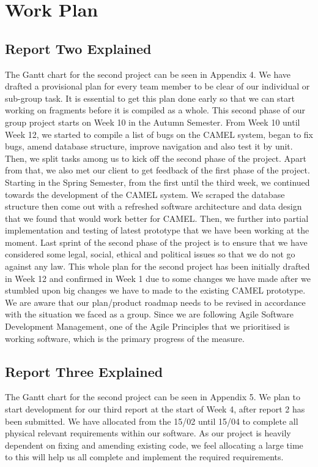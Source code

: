 \section{Work Plan}
\subsection*{Report Two Explained}
The Gantt chart for the second project can be seen in Appendix 4. We have drafted a provisional plan for every team member to be clear of our individual or sub-group task. It is essential to get this plan done early so that we can start working on fragments before it is compiled as a whole. This second phase of our group project starts on Week 10 in the Autumn Semester. From Week 10 until Week 12, we started to compile a list of bugs on the CAMEL system, began to fix bugs, amend database structure, improve navigation and also test it by unit. Then, we split tasks among us to kick off the second phase of the project. Apart from that, we also met our client to get feedback of the first phase of the project. Starting in the Spring Semester, from the first until the third week, we continued towards the development of the CAMEL system. We scraped  the database structure then come out with a refreshed software architecture and data design that we found that would work better for CAMEL. Then, we further into partial implementation and testing of latest prototype that we have been working at the moment. Last sprint of the second phase of the project is to ensure that we have considered some legal, social, ethical and political issues so that we do not go against any law. This whole plan for the second project has been initially drafted in Week 12 and  confirmed in Week 1 due to some changes we have made after we stumbled upon big changes we have to made to the existing CAMEL prototype. We are aware that our plan/product roadmap needs to be revised in accordance with the  situation we faced as a group.  Since we are following Agile Software Development Management, one of the Agile Principles that we prioritised is working software, which is the primary progress of the measure.\\

\subsection*{Report Three Explained}

The Gantt chart for the second project can be seen in Appendix 5. We plan to start development for our third report at the start of Week 4, after report 2 has been submitted. We have allocated from the 15/02 until 15/04 to complete all physical relevant requirements within our software. As our project is heavily dependent on fixing and amending existing code, we feel allocating a large time to this will help us all complete and implement the required requirements.\\

